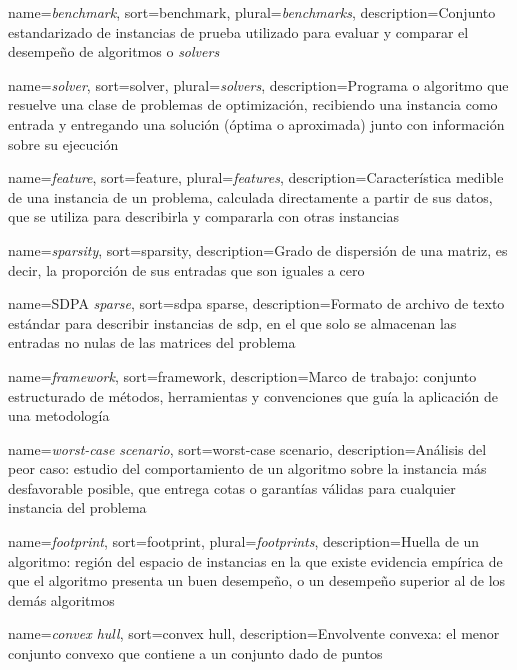 \usepackage[acronym,toc]{glossaries}
\makeglossaries

{
        name={\textit{benchmark}},
        sort={benchmark},
        plural={\textit{benchmarks}},
        description={Conjunto estandarizado de instancias de prueba utilizado
para evaluar y comparar el desempeño de algoritmos o \textit{solvers}}
}

{
        name={\textit{solver}},
        sort={solver},
        plural={\textit{solvers}},
        description={Programa o algoritmo que resuelve una clase de problemas de
optimización, recibiendo una instancia como entrada y entregando una solución
(óptima o aproximada) junto con información sobre su ejecución}
}

{
        name={\textit{feature}},
        sort={feature},
        plural={\textit{features}},
        description={Característica medible de una instancia de un problema,
calculada directamente a partir de sus datos, que se utiliza para describirla
y compararla con otras instancias}
}

{
        name={\textit{sparsity}},
        sort={sparsity},
        description={Grado de dispersión de una matriz, es decir, la proporción
de sus entradas que son iguales a cero}
}

{
        name={SDPA \textit{sparse}},
        sort={sdpa sparse},
        description={Formato de archivo de texto estándar para describir
instancias de \acrshort{sdp}, en el que solo se almacenan las entradas no nulas
de las matrices del problema}
}

{
        name={\textit{framework}},
        sort={framework},
        description={Marco de trabajo: conjunto estructurado de métodos,
herramientas y convenciones que guía la aplicación de una metodología}
}

{
        name={\textit{worst-case scenario}},
        sort={worst-case scenario},
        description={Análisis del peor caso: estudio del comportamiento de un
algoritmo sobre la instancia más desfavorable posible, que entrega cotas o
garantías válidas para cualquier instancia del problema}
}


{
        name={\textit{footprint}},
        sort={footprint},
        plural={\textit{footprints}},
        description={Huella de un algoritmo: región del espacio de instancias en
la que existe evidencia empírica de que el algoritmo presenta un buen
desempeño, o un desempeño superior al de los demás algoritmos}
}

{
        name={\textit{convex hull}},
        sort={convex hull},
        description={Envolvente convexa: el menor conjunto convexo que contiene
a un conjunto dado de puntos}
}

